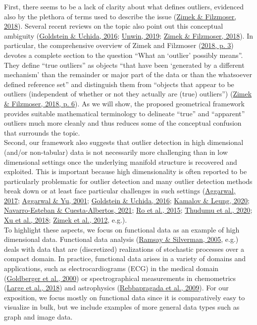 \documentclass[
  10pt]{article}
\begin{document}
First, there seems to be a lack of clarity about what defines outliers, evidenced also by the plethora of terms used to describe the issue (\protect\hyperlink{ref-zimek2018there}{Zimek \& Filzmoser, 2018}). Several recent reviews on the topic also point out this conceptual ambiguity (\protect\hyperlink{ref-goldstein2016comparative}{Goldstein \& Uchida, 2016}; \protect\hyperlink{ref-unwin2019multivariate}{Unwin, 2019}; \protect\hyperlink{ref-zimek2018there}{Zimek \& Filzmoser, 2018}). In particular, the comprehensive overview of Zimek and Filzmoser (\protect\hyperlink{ref-zimek2018there}{2018, p. 3}) devotes a complete section to the question ``What an `outlier' possibly means''. They define ``true outliers'' as objects ``that have been `generated by a different mechanism' than the remainder or major part of the data or than the whatsoever defined reference set'' and distinguish them from ``objects that appear to be outliers (independent of whether or not they actually are (true) outliers'') (\protect\hyperlink{ref-zimek2018there}{Zimek \& Filzmoser, 2018, p. 6}). As we will show, the proposed geometrical framework provides suitable mathematical terminology to delineate ``true'' and ``apparent'' outliers much more cleanly and thus reduces some of the conceptual confusion that surrounds the topic.\\
Second, our framework also suggests that outlier detection in high dimensional (and/or non-tabular) data is not necessarily more challenging than in low dimensional settings once the underlying manifold structure is recovered and exploited. This is important because high dimensionality is often reported to be particularly problematic for outlier detection and many outlier detection methods break down or at least face particular challenges in such settings (\protect\hyperlink{ref-aggarwal2017outlier}{Aggarwal, 2017}; \protect\hyperlink{ref-aggarwal2001outlier}{Aggarwal \& Yu, 2001}; \protect\hyperlink{ref-goldstein2016comparative}{Goldstein \& Uchida, 2016}; \protect\hyperlink{ref-kamalov2020outlier}{Kamalov \& Leung, 2020}; \protect\hyperlink{ref-navarro2021high}{Navarro-Esteban \& Cuesta-Albertos, 2021}; \protect\hyperlink{ref-ro2015outlier}{Ro et al., 2015}; \protect\hyperlink{ref-thudumu2020comprehensive}{Thudumu et al., 2020}; \protect\hyperlink{ref-xu2018comparison}{Xu et al., 2018}; \protect\hyperlink{ref-zimek2012survey}{Zimek et al., 2012}, e.g.).\\
To highlight these aspects, we focus on functional data as an example of high dimensional data. Functional data analysis (\protect\hyperlink{ref-ramsay2005functional}{Ramsay \& Silverman, 2005}, e.g.) deals with data that are (discretized) realizations of stochastic processes over a compact domain. In practice, functional data arises in a variety of domains and applications, such as electrocardiograms (ECG) in the medical domain (\protect\hyperlink{ref-goldberger2000physiobank}{Goldberger et al., 2000}) or spectrographical measurements in chemometrics (\protect\hyperlink{ref-large2018}{Large et al., 2018}) and astrophysics (\protect\hyperlink{ref-rebbapragada2009finding}{Rebbapragada et al., 2009}). For our exposition, we focus mostly on functional data since it is comparatively easy to visualize in bulk, but we include examples of more general data types such as graph and image data.
\end{document}

